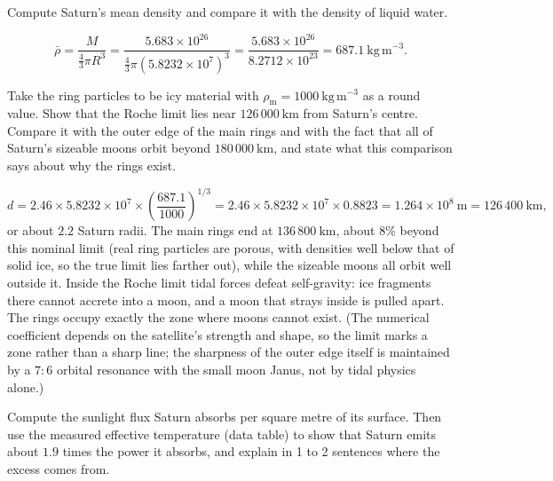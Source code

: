 \parti {} Compute Saturn's mean density and compare it with the density of liquid water.

\begin{solution}
\[
  \bar{\rho} = \frac{M}{\frac{4}{3}\pi R^3}
             = \frac{5.683 \times 10^{26}}{\frac{4}{3}\pi (5.8232 \times 10^{7})^3}
             = \frac{5.683 \times 10^{26}}{8.2712 \times 10^{23}}
             = 687.1\ \mathrm{kg\,m^{-3}}.
\]
\end{solution}

\parti {} Take the ring particles to be icy material with $\rho_{\mathrm{m}} = 1000\ \mathrm{kg\,m^{-3}}$ as a round value.
Show that the Roche limit lies near $126\,000\ \mathrm{km}$ from Saturn's centre.
Compare it with the outer edge of the main rings and with the fact that all of Saturn's sizeable moons orbit beyond $180\,000\ \mathrm{km}$, and state what this comparison says about why the rings exist.

\begin{solution}
\[
  d = 2.46 \times 5.8232 \times 10^{7} \times \left( \frac{687.1}{1000} \right)^{1/3}
    = 2.46 \times 5.8232 \times 10^{7} \times 0.8823
    = 1.264 \times 10^{8}\ \mathrm{m} = 126\,400\ \mathrm{km},
\]
or about $2.2$ Saturn radii.
The main rings end at $136\,800\ \mathrm{km}$, about $8\%$ beyond this nominal limit (real ring particles are porous, with densities well below that of solid ice, so the true limit lies farther out), while the sizeable moons all orbit well outside it.
Inside the Roche limit tidal forces defeat self-gravity: ice fragments there cannot accrete into a moon, and a moon that strays inside is pulled apart.
The rings occupy exactly the zone where moons cannot exist.
(The numerical coefficient depends on the satellite's strength and shape, so the limit marks a zone rather than a sharp line; the sharpness of the outer edge itself is maintained by a $7{:}6$ orbital resonance with the small moon Janus, not by tidal physics alone.)
\end{solution}

\parti {} Compute the sunlight flux Saturn absorbs per square metre of its surface.
Then use the measured effective temperature (data table) to show that Saturn emits about $1.9$ times the power it absorbs, and explain in 1 to 2 sentences where the excess comes from.

